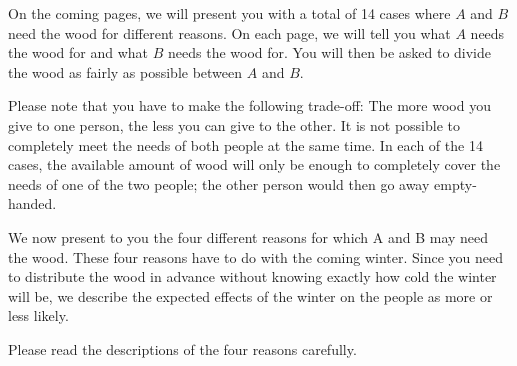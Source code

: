 \documentclass[egregdoesnotlikesansseriftitles]{scrartcl}
\begin{document}
On the coming pages, we will present you with a total of 14 cases where $A$ and $B$ need the wood for different reasons. %
On each page, we will tell you what $A$ needs the wood for and what $B$ needs the wood for. %
You will then be asked to divide the wood as fairly as possible between $A$ and $B$. %

Please note that you have to make the following trade-off: %
The more wood you give to one person, the less you can give to the other. %
It is not possible to completely meet the needs of both people at the same time. %
In each of the 14 cases, the available amount of wood will only be enough to completely cover the needs of one of the two people; the other person would then go away empty-handed. %

We now present to you the four different reasons for which A and B may need the wood. %
These four reasons have to do with the coming winter. %
Since you need to distribute the wood in advance without knowing exactly how cold the winter will be, we describe the expected effects of the winter on the people as more or less likely. %

Please read the descriptions of the four reasons carefully.\vspace{2ex} %
\end{document}

